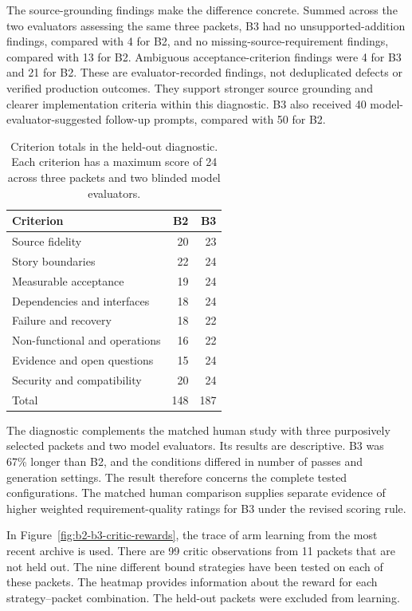 \documentclass[manuscript,review]{acmart}
\begin{document}
The source-grounding findings make the difference concrete. Summed across the two evaluators assessing the same three packets, B3 had no unsupported-addition findings, compared with 4 for B2, and no missing-source-requirement findings, compared with 13 for B2. Ambiguous acceptance-criterion findings were 4 for B3 and 21 for B2. These are evaluator-recorded findings, not deduplicated defects or verified production outcomes. They support stronger source grounding and clearer implementation criteria within this diagnostic. B3 also received 40 model-evaluator-suggested follow-up prompts, compared with 50 for B2.

\begin{table}[t]
\centering
\small
\caption{Criterion totals in the held-out diagnostic. Each criterion has a maximum score of 24 across three packets and two blinded model evaluators.}
\label{tab:b2-b3-heldout-diagnostic}
\begin{tabularx}{\columnwidth}{@{}Xrr@{}}
\toprule
Criterion & B2 & B3 \\
\midrule
Source fidelity & 20 & 23 \\
Story boundaries & 22 & 24 \\
Measurable acceptance & 19 & 24 \\
Dependencies and interfaces & 18 & 24 \\
Failure and recovery & 18 & 22 \\
Non-functional and operations & 16 & 22 \\
Evidence and open questions & 15 & 24 \\
Security and compatibility & 20 & 24 \\
\midrule
Total & 148 & 187 \\
\bottomrule
\end{tabularx}
\end{table}

The diagnostic complements the matched human study with three purposively selected packets and two model evaluators. Its results are descriptive. B3 was 67\% longer than B2, and the conditions differed in number of passes and generation settings. The result therefore concerns the complete tested configurations. The matched human comparison supplies separate evidence of higher weighted requirement-quality ratings for B3 under the revised scoring rule.

In Figure~\ref{fig:b2-b3-critic-rewards}, the trace of arm learning from the most recent archive is used. There are 99 critic observations from 11 packets that are not held out. The nine different bound strategies have been tested on each of these packets. The heatmap provides information about the reward for each strategy--packet combination. The held-out packets were excluded from learning.
\end{document}
